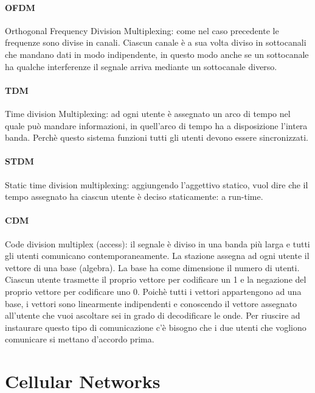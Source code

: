 \documentclass{article}
\begin{document}
\paragraph{OFDM} Orthogonal Frequency Division Multiplexing: come nel caso
precedente le frequenze sono divise in canali. Ciascun canale è a sua volta
diviso in sottocanali che mandano dati in modo indipendente, in questo modo
anche se un sottocanale ha qualche interferenze il segnale arriva mediante un
sottocanale diverso.

\paragraph{TDM} Time division Multiplexing: ad ogni utente è assegnato un arco
di tempo nel quale può mandare informazioni, in quell'arco di tempo ha a
disposizione l'intera banda. Perchè questo sistema funzioni tutti gli utenti
devono essere sincronizzati.

\paragraph{STDM} Static time division multiplexing: aggiungendo l'aggettivo
statico, vuol dire che il tempo assegnato ha ciascun utente è deciso
staticamente: a run-time.

\paragraph{CDM}
\label{CDM}
Code division multiplex (access): il segnale è diviso in una banda
più larga e tutti gli utenti comunicano contemporaneamente. La stazione assegna
ad ogni utente il vettore di una base (algebra). La base ha come dimensione il
numero di utenti. Ciascun utente trasmette il proprio vettore per codificare un
1 e la negazione del proprio vettore per codificare uno 0. Poichè tutti i vettori
appartengono ad una base, i vettori sono linearmente indipendenti e conoscendo il vettore
assegnato all'utente che vuoi ascoltare sei in grado di decodificare le onde. Per riuscire
ad instaurare questo tipo di comunicazione c'è bisogno che i due utenti che
vogliono comunicare si mettano d'accordo prima.

\section{Cellular Networks}
\end{document}
